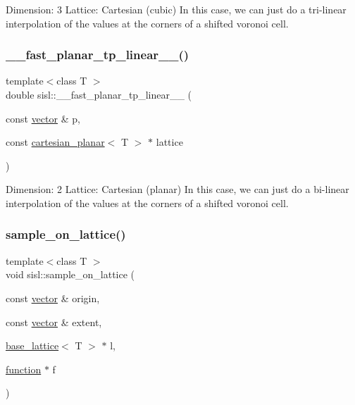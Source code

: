 Dimension\+: 3 Lattice\+: Cartesian (cubic) In this case, we can just do a tri-\/linear interpolation of the values at the corners of a shifted voronoi cell. \mbox{\label{namespacesisl_a7295912c88c93a730de6a93f9bfff854}} 
\subsubsection{\texorpdfstring{\+\_\+\+\_\+fast\+\_\+planar\+\_\+tp\+\_\+linear\+\_\+\+\_\+()}{\_\_fast\_planar\_tp\_linear\_\_()}}
{\footnotesize\ttfamily template$<$class T $>$ \\
double sisl\+::\+\_\+\+\_\+fast\+\_\+planar\+\_\+tp\+\_\+linear\+\_\+\+\_\+ (\begin{DoxyParamCaption}\item[{const \hyperlink{namespacesisl_a2069bd5374a9be042ff3ce3306d41e1a}{vector} \&}]{p,  }\item[{const \hyperlink{classsisl_1_1cartesian__planar}{cartesian\+\_\+planar}$<$ T $>$ $\ast$}]{lattice }\end{DoxyParamCaption})\hspace{0.3cm}{\ttfamily [inline]}}

Dimension\+: 2 Lattice\+: Cartesian (planar) In this case, we can just do a bi-\/linear interpolation of the values at the corners of a shifted voronoi cell. \mbox{\label{namespacesisl_aac0589ffc20d038475dc0b502cbcbfdf}} 
\subsubsection{\texorpdfstring{sample\+\_\+on\+\_\+lattice()}{sample\_on\_lattice()}}
{\footnotesize\ttfamily template$<$class T $>$ \\
void sisl\+::sample\+\_\+on\+\_\+lattice (\begin{DoxyParamCaption}\item[{const \hyperlink{namespacesisl_a2069bd5374a9be042ff3ce3306d41e1a}{vector} \&}]{origin,  }\item[{const \hyperlink{namespacesisl_a2069bd5374a9be042ff3ce3306d41e1a}{vector} \&}]{extent,  }\item[{\hyperlink{classsisl_1_1base__lattice}{base\+\_\+lattice}$<$ T $>$ $\ast$}]{l,  }\item[{\hyperlink{classsisl_1_1function}{function} $\ast$}]{f }\end{DoxyParamCaption})}

